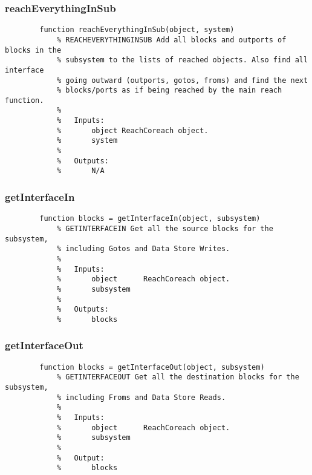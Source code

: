 \documentclass[12pt,letterpaper]{report}
\begin{document}
		\subsubsection{reachEverythingInSub}
\begin{lstlisting}
        function reachEverythingInSub(object, system)
            % REACHEVERYTHINGINSUB Add all blocks and outports of blocks in the
            % subsystem to the lists of reached objects. Also find all interface
            % going outward (outports, gotos, froms) and find the next
            % blocks/ports as if being reached by the main reach function.
            %
            %   Inputs:
            %       object ReachCoreach object.
            %       system
            %
            %   Outputs:
            %       N/A
\end{lstlisting}
		
		\subsubsection{getInterfaceIn}
\begin{lstlisting}
        function blocks = getInterfaceIn(object, subsystem)
            % GETINTERFACEIN Get all the source blocks for the subsystem,
            % including Gotos and Data Store Writes.
            %
            %   Inputs:
            %       object      ReachCoreach object.
            %       subsystem
            %
            %   Outputs:
            %       blocks
\end{lstlisting}
		
		\subsubsection{getInterfaceOut}
\begin{lstlisting}
        function blocks = getInterfaceOut(object, subsystem)
            % GETINTERFACEOUT Get all the destination blocks for the subsystem,
            % including Froms and Data Store Reads.
            %
            %   Inputs:
            %       object      ReachCoreach object.
            %       subsystem
            %
            %   Output:
            %       blocks
\end{lstlisting}
		
\end{document}
